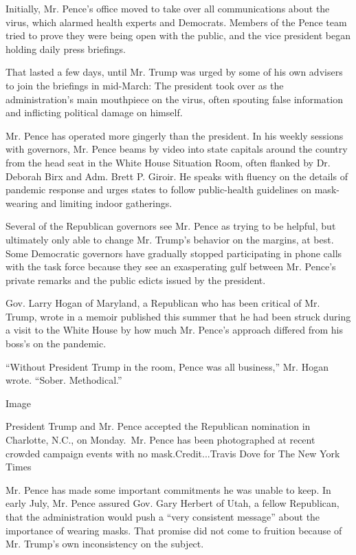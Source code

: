Initially, Mr. Pence's office moved to take over all communications
about the virus, which alarmed health experts and Democrats. Members of
the Pence team tried to prove they were being open with the public, and
the vice president began holding daily press briefings.

That lasted a few days, until Mr. Trump was urged by some of his own
advisers to join the briefings in mid-March: The president took over as
the administration's main mouthpiece on the virus, often spouting false
information and inflicting political damage on himself.

Mr. Pence has operated more gingerly than the president. In his weekly
sessions with governors, Mr. Pence beams by video into state capitals
around the country from the head seat in the White House Situation Room,
often flanked by Dr. Deborah Birx and Adm. Brett P. Giroir. He speaks
with fluency on the details of pandemic response and urges states to
follow public-health guidelines on mask-wearing and limiting indoor
gatherings.

Several of the Republican governors see Mr. Pence as trying to be
helpful, but ultimately only able to change Mr. Trump's behavior on the
margins, at best. Some Democratic governors have gradually stopped
participating in phone calls with the task force because they see an
exasperating gulf between Mr. Pence's private remarks and the public
edicts issued by the president.

Gov. Larry Hogan of Maryland, a Republican who has been critical of Mr.
Trump, wrote in a memoir published this summer that he had been struck
during a visit to the White House by how much Mr. Pence's approach
differed from his boss's on the pandemic.

``Without President Trump in the room, Pence was all business,'' Mr.
Hogan wrote. ``Sober. Methodical.''

Image

President Trump and Mr. Pence accepted the Republican nomination in
Charlotte, N.C., on Monday.~Mr. Pence has been photographed at recent
crowded campaign events with no mask.Credit...Travis Dove for The New
York Times

Mr. Pence has made some important commitments he was unable to keep. In
early July, Mr. Pence assured Gov. Gary Herbert of Utah, a fellow
Republican, that the administration would push a ``very consistent
message'' about the importance of wearing masks. That promise did not
come to fruition because of Mr. Trump's own inconsistency on the
subject.

